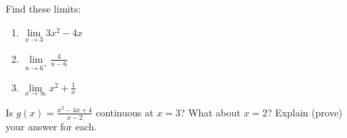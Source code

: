 Find these limits:
\begin{enumerate}
    \item $\lim\limits_{x\to 3} 3x^2-4x$\vspace{\fill}
    \item $\lim\limits_{n\to 6^+} \frac{4}{n-6}$\vspace{\fill}
    \item $\lim\limits_{x\to \infty} x^2+\frac{1}{x}$\vspace{\fill}
\end{enumerate}

Is $g(x)=\frac{x^2-4x+4}{x-2}$ continuous at $x=3$? What about $x=2$? Explain (prove) your answer for each.
